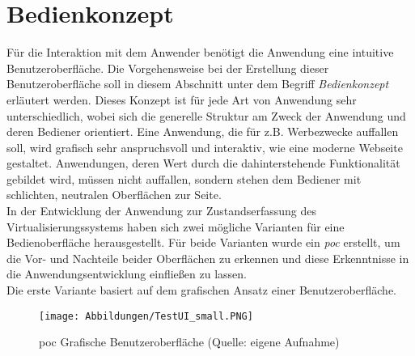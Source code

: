 \section{Bedienkonzept}\label{sec:Bedienkonzept}
Für die Interaktion mit dem Anwender benötigt die Anwendung eine intuitive Benutzeroberfläche. Die Vorgehensweise bei der Erstellung dieser Benutzeroberfläche soll in diesem Abschnitt unter dem Begriff \textit{Bedienkonzept} erläutert werden. Dieses Konzept ist für jede Art von Anwendung sehr unterschiedlich, wobei sich die generelle Struktur am Zweck der Anwendung und deren Bediener orientiert. Eine Anwendung, die für z.B. Werbezwecke auffallen soll, wird grafisch sehr anspruchsvoll und interaktiv, wie eine moderne Webseite gestaltet. Anwendungen, deren Wert durch die dahinterstehende Funktionalität gebildet wird, müssen nicht auffallen, sondern stehen dem Bediener mit schlichten, neutralen Oberflächen zur Seite.\medskip\\
In der Entwicklung der Anwendung zur Zustandserfassung des Virtualisierungssystems haben sich zwei mögliche Varianten für eine Bedienoberfläche herausgestellt. Für beide Varianten wurde ein \textit{\acrfull{poc}} erstellt, um die Vor- und Nachteile beider Oberflächen zu erkennen und diese Erkenntnisse in die Anwendungsentwicklung einfließen zu lassen.\medskip\\
Die erste Variante basiert auf dem grafischen Ansatz einer Benutzeroberfläche.
\begin{figure}[H]
    \centering
    \texttt{[image: Abbildungen/TestUI\_small.PNG]}\caption[Proof of Concept grafische Benutzeroberfläche]{\acrshort{poc} Grafische Benutzeroberfläche (Quelle: eigene Aufnahme)}
    \label{fig:TestUI}
\end{figure}
